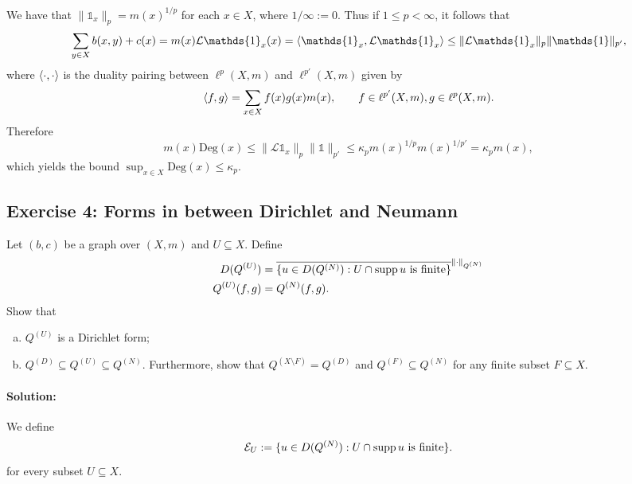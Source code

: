 We have that $\|\mathds{1}_x\|_p=m(x)^{1/p}$ for each $x\in X$, where $1/\infty := 0$. Thus if $1\le p<\infty$, it follows that
\begin{equation*}
	\sum_{y\in X}b(x,y) + c(x) = m(x)\mathcal{L}\mathds{1}_x(x) = \braket{\mathds{1}_x, \mathcal{L}\mathds{1}_x} \le \|\mathcal{L}\mathds{1}_x\|_p \|\mathds{1}\|_{p'},
\end{equation*}
where $\braket{\cdot, \cdot}$ is the duality pairing between $\ell^p(X,m)$ and $\ell^{p'}(X,m)$ given by
\begin{equation*}
	\braket{f,g} = \sum_{x\in X}f(x)g(x)m(x), \qquad f\in \ell^{p'}(X,m), g\in \ell^p(X,m).
\end{equation*}
Therefore
\begin{equation}
	m(x)\mathrm{Deg}(x) \le \|\mathcal{L}\mathds{1}_x\|_p \|\mathds{1}\|_{p'} \le \kappa_p m(x)^{1/p}m(x)^{1/p'} = \kappa_p m(x),
\end{equation}
which yields the bound $\sup_{x\in X}\mathrm{Deg}(x) \le \kappa_p$.

\subsection{Exercise 4: Forms in between Dirichlet and Neumann}
Let $(b,c)$ be a graph over $(X,m)$ and $U\subseteq X$. Define
\begin{equation*}
\begin{aligned}
	D(Q^{(U)}) &= \overline{\{u\in D(Q^{(N)}) : U \cap \operatorname{supp} u \text{ is finite} \}}^{\|\cdot\|_{Q^{(N)}}} \\
	Q^{(U)}(f,g) &= Q^{(N)}(f,g).
\end{aligned}		
\end{equation*}
Show that
\begin{enumerate}[(a)]
	\item $Q^{(U)}$ is a Dirichlet form;
	\item $Q^{(D)}\subseteq Q^{(U)} \subseteq Q^{(N)}$. Furthermore, show that $Q^{(X\setminus F)} = Q^{(D)}$ and $Q^{(F)}\subseteq Q^{(N)}$ for any finite subset $F\subseteq X$.
\end{enumerate}

\paragraph{Solution:}

We define
\begin{equation}
	\mathcal{E}_U := \{u\in D(Q^{(N)}) : U \cap \operatorname{supp} u \text{ is finite} \}.
\end{equation}
for every subset $U\subseteq X$.

